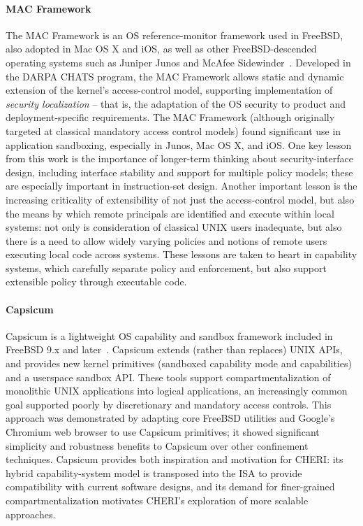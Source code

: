 \paragraph{MAC Framework} %
The MAC Framework is an OS reference-monitor framework used in FreeBSD, also
adopted in Mac OS X and iOS, as well as other FreeBSD-descended operating
systems such as Juniper Junos and McAfee Sidewinder~\cite{watson13}.
Developed in the DARPA CHATS program, the MAC Framework allows static and
dynamic extension of the kernel's access-control model, supporting
implementation of {\em security localization} --
that is,
the adaptation of the OS
security to product and deployment-specific requirements.
The MAC Framework (although originally targeted at classical mandatory access
control models) found significant use in application sandboxing, especially in
Junos, Mac OS X, and iOS.
One key lesson from this work is the importance of longer-term thinking about
security-interface design,
including
interface stability and
support for multiple policy models; these are especially important in
instruction-set design.
Another important lesson is the increasing criticality of extensibility of not
just the access-control model, but also the means by which remote principals
are identified and execute within local systems:
not only is consideration of classical UNIX users inadequate,
but also there is a need to allow widely varying policies and
notions of remote users executing local code across systems.
These lessons are taken to heart in capability systems, which carefully
separate policy and enforcement, but also support extensible policy through
executable code.

\paragraph{Capsicum} %
Capsicum is a lightweight OS capability and sandbox framework included in
FreeBSD 9.x and later~\cite{Watson10,Watson10a}.
Capsicum extends (rather than replaces) UNIX APIs, and
provides new kernel primitives
(sandboxed capability mode and capabilities) and a userspace sandbox
API.
These tools support compartmentalization of monolithic UNIX applications
into logical applications, an increasingly common goal supported poorly by
discretionary and mandatory access controls.
This approach was demonstrated by adapting core FreeBSD utilities and
Google's Chromium web browser to use Capsicum primitives; it showed
significant simplicity and robustness benefits to Capsicum over other
confinement techniques.
Capsicum provides both inspiration and motivation for CHERI: its hybrid
capability-system model is transposed into the ISA to provide
compatibility with current software designs, and its demand for finer-grained
compartmentalization motivates CHERI's exploration of more scalable
approaches.

